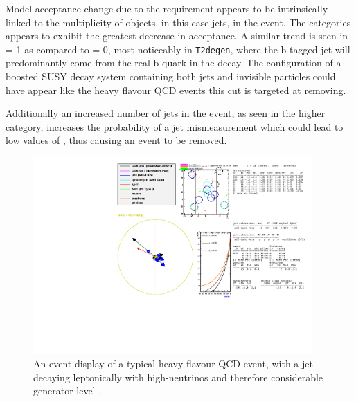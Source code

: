 Model acceptance change due to the requirement appears to be intrinsically
linked to the multiplicity of objects, in this case jets, in the event. The
\njhigh categories appears to exhibit the greatest decrease in acceptance. A
similar trend is
seen in \nb = 1 as compared to \nb = 0, most noticeably in \texttt{T2degen},
where the b-tagged jet will predominantly come from the real b quark in the
decay. The configuration of a boosted SUSY decay system containing both jets and
invisible \chiz particles could have appear like the heavy flavour QCD events
this cut is targeted at removing. 

Additionally an increased number of jets in the event, as seen in the higher \nj
category, increases the probability of a jet mismeasurement which could lead to
low values of \mindphistar, thus causing an event to be removed.

\clearpage
\begin{figure}
    \centering
    \includegraphics[width=0.95\textwidth]
    {Figs/eventDisplays/Had_QCD_MG_MC_HT375_skim_displays_singleEvent_2_noPF.pdf}
    \caption{An event display of a typical heavy flavour QCD event, with a jet
    decaying leptonically with high-\Pt neutrinos and therefore considerable
    generator-level \met.}
    \label{fig:event_display_QCD}
\end{figure}
